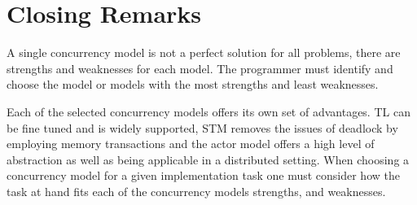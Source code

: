 




\section{Closing Remarks}\label{sec:choose_closing}
A single concurrency model is not a perfect solution for all problems, there are strengths and weaknesses for each model. The programmer must identify and choose the model or models with the most strengths and least weaknesses. 

Each of the selected concurrency models offers its own set of advantages. \ac{TL} can be fine tuned and is widely supported, \ac{STM} removes the issues of deadlock by employing memory transactions and the actor model offers a high level of abstraction as well as being applicable in a distributed setting. When choosing a concurrency model for a given implementation task one must consider how the task at hand fits each of the concurrency models strengths, and weaknesses.

